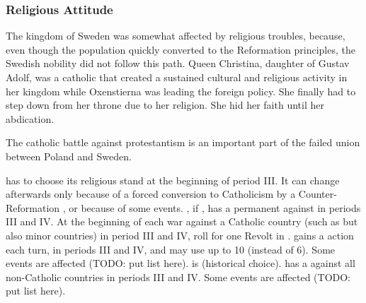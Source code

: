 \subsubsection{Religious Attitude}\label{chSpecific:Sweden:Reformation}
\begin{histoire}
  The kingdom of Sweden was somewhat affected by religious troubles,
  because, even though the population quickly converted to the
  Reformation principles, the Swedish nobility did not follow this
  path. Queen Christina, daughter of Gustav Adolf, was a catholic that
  created a sustained cultural and religious activity in her kingdom
  while Oxenstierna was leading the foreign policy. She finally had to
  step down from her throne due to her religion. She hid her faith until
  her abdication.

  The catholic battle against protestantism is an important part of the
  failed union between Poland and Sweden.
\end{histoire}
\aparag \SUE has to choose its religious stand at the beginning of
period III. It can change afterwards only because of a forced conversion
to Catholicism by a Counter-Reformation \MAJ, or because of some events.
\bparag \POL, if , has a permanent \CB against \SUE in
periods III and IV.
\bparag At the beginning of each war against a Catholic country (such as \POL
but also minor countries) in period III and IV, roll for one Revolt in \SUE.
\bparag \SUE gains a \TFI action each turn, in periods III and IV, and
may use up to 10 \TradeFLEET (instead of 6).
\bparag Some events are affected (TODO: put list here).
\aparag[Tolerant] \SUE is  (historical choice).
\aparag[Catholic] \SUE has a \CB against all non-Catholic countries in
periods III and IV.
\bparag Some events are affected (TODO: put list here).


